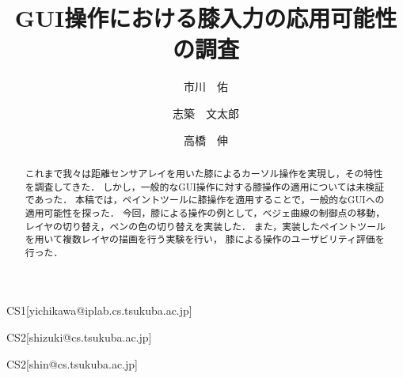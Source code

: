 \documentclass[submit, techrep]{ipsj}
\begin{document}
\title{GUI操作における膝入力の応用可能性の調査}






\author{市川　佑}{}{CS1}[yichikawa@iplab.cs.tsukuba.ac.jp]
\author{志築　文太郎}{}{CS2}[shizuki@cs.tsukuba.ac.jp]
\author{高橋　伸}{}{CS2}[shin@cs.tsukuba.ac.jp]

\begin{abstract}
これまで我々は距離センサアレイを用いた膝によるカーソル操作を実現し，その特性を調査してきた．
しかし，一般的なGUI操作に対する膝操作の適用については未検証であった．
本稿では，ペイントツールに膝操作を適用することで，一般的なGUIへの適用可能性を探った．
今回，膝による操作の例として，ベジェ曲線の制御点の移動，
レイヤの切り替え，ペンの色の切り替えを実装した．
また，実装したペイントツールを用いて複数レイヤの描画を行う実験を行い，
膝による操作のユーザビリティ評価を行った．
\end{abstract}






\maketitle

\end{document}
